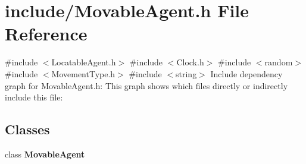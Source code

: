 \section{include/\+Movable\+Agent.h File Reference}
\label{_movable_agent_8h}
{\ttfamily \#include $<$Locatable\+Agent.\+h$>$}\newline
{\ttfamily \#include $<$Clock.\+h$>$}\newline
{\ttfamily \#include $<$random$>$}\newline
{\ttfamily \#include $<$Movement\+Type.\+h$>$}\newline
{\ttfamily \#include $<$string$>$}\newline
Include dependency graph for Movable\+Agent.\+h\+:
This graph shows which files directly or indirectly include this file\+:
\subsection*{Classes}
\begin{DoxyCompactItemize}
\item 
class \textbf{ Movable\+Agent}
\end{DoxyCompactItemize}
